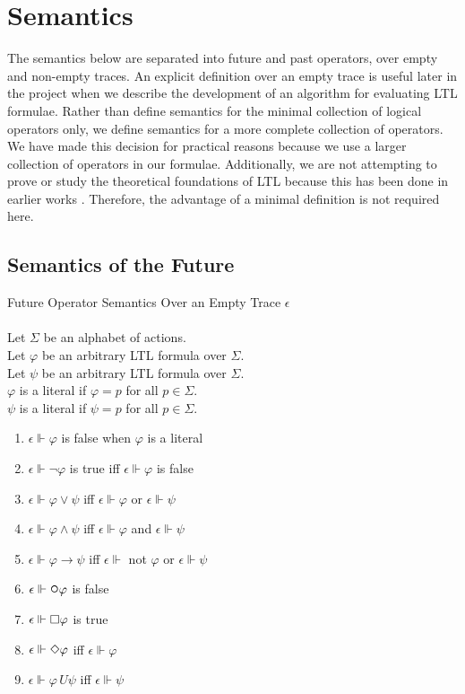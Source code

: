\section{Semantics}

The semantics below are separated into future and past operators, over empty and non-empty traces.  An explicit definition over an empty trace is useful later in the project when we describe the development of an algorithm for evaluating LTL formulae.  Rather than define semantics for the minimal collection of logical operators only, we define semantics for a more complete collection of operators.  We have made this decision for practical reasons because we use a larger collection of operators in our formulae.  Additionally, we are not attempting to prove or study the theoretical foundations of LTL because this has been done in earlier works \cite{Pnueli}.  Therefore, the advantage of a minimal definition is not required here.

\newpage

\subsection{Semantics of the Future}
\label{sec:LTLFutureSemantics}

\begin{definition}Future Operator Semantics Over an Empty Trace $\epsilon$\\
\label{def:FutureEmptyTraceSemantics}
\\
Let $\Sigma$ be an alphabet of actions.\\
Let $\varphi$ be an arbitrary LTL formula over $\Sigma$.\\
Let $\psi$ be an arbitrary LTL formula over $\Sigma$.\\
$\varphi$ is a literal if $\varphi = p$ for all $p \in \Sigma$.\\
$\psi$ is a literal if $\psi = p$ for all $p \in \Sigma$.

\begin{enumerate}[start=1]
\item $ \epsilon \Vdash \varphi $ is false when $ \varphi $ is a literal
\item $ \epsilon \Vdash \neg\varphi $ is true iff $ \epsilon \Vdash \varphi $ is false
\item $ \epsilon \Vdash \varphi \lor \psi $ iff $ \epsilon \Vdash \varphi $ or $ \epsilon \Vdash \psi $
\item $ \epsilon \Vdash \varphi \land \psi $ iff $ \epsilon \Vdash \varphi $ and $ \epsilon \Vdash \psi $
\item $ \epsilon \Vdash \varphi \rightarrow \psi $ iff $ \epsilon \Vdash $ not $ \varphi $ or $ \epsilon \Vdash \psi $
\item $ \epsilon \Vdash \LTLnext\varphi $ is false
\item $ \epsilon \Vdash \square\varphi $ is true
\item $ \epsilon \Vdash \Diamond\varphi $ iff $ \epsilon \Vdash \varphi $
\item $ \epsilon \Vdash \varphi \,U \psi $ iff $ \epsilon \Vdash \psi $
\end{enumerate}
\end{definition}


